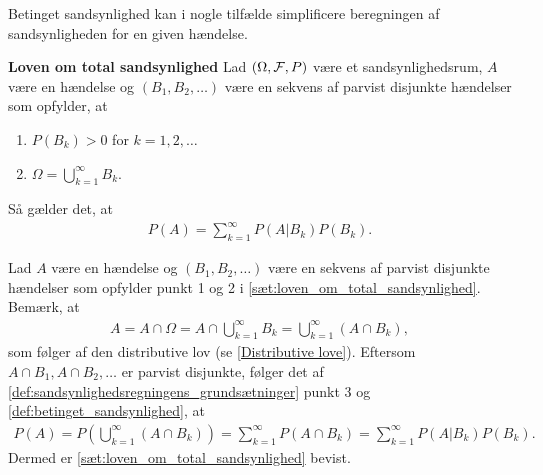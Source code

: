 Betinget sandsynlighed kan i nogle tilfælde simplificere beregningen af sandsynligheden for en given hændelse. 

\begin{minipage}\textwidth
\begin{thmx} \textbf{Loven om total sandsynlighed} \label{sæt:loven_om_total_sandsynlighed} %
\newline
Lad $(\Omega, \mathcal{F}, P)$ være et sandsynlighedsrum, $A$ være en hændelse og $(B_1,B_2,\ldots)$ være en sekvens af parvist disjunkte hændelser som opfylder, at
\begin{enumerate}
\item $P(B_k)>0$ for $k = 1, 2, \ldots$
\item $\Omega=\displaystyle\bigcup_{k=1}^\infty B_k$.
\end{enumerate}
Så gælder det, at
\begin{align*}
    P(A)=\sum_{k = 1}^\infty P(A|B_k)P(B_k).
\end{align*}
\end{thmx}
\end{minipage}
\begin{bev} \textbf{} %
\newline
Lad $A$ være en hændelse og $(B_1,B_2,\ldots)$ være en sekvens af parvist disjunkte hændelser som opfylder punkt 1 og 2 i \autoref{sæt:loven_om_total_sandsynlighed}. Bemærk, at
\begin{align*}
    A=A\cap \Omega=A\cap\bigcup_{k=1}^\infty B_k=\bigcup_{k=1}^\infty(A\cap B_k),
\end{align*}
som følger af den distributive lov (se \autoref{Distributive love}). 
Eftersom $A\cap B_1,A\cap B_2,\dots$ er parvist disjunkte, følger det af \autoref{def:sandsynlighedsregningens_grundsætninger} punkt 3 og \autoref{def:betinget_sandsynlighed}, at
\begin{align*}
    P(A)=P\left(\bigcup_{k=1}^\infty(A\cap B_k)\right) =\sum_{k=1}^\infty P(A\cap B_k)=\sum_{k=1}^\infty P(A|B_k)P(B_k).
\end{align*}
Dermed er \autoref{sæt:loven_om_total_sandsynlighed} bevist.
\end{bev}

